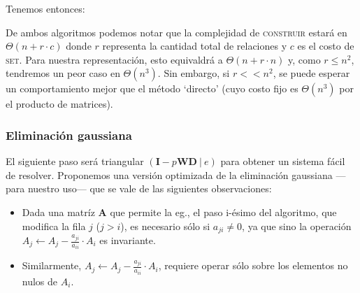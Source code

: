 \noindent Tenemos entonces:
\vspace{1em}


\vspace{1em}


\vspace{1em}

De ambos algoritmos podemos notar que la complejidad de \textsc{construir} estará en $\Theta(n + r \cdot c)$ donde $r$ representa la cantidad total de relaciones y $c$ es el costo de \textsc{set}. Para nuestra representación, esto equivaldrá a $\Theta(n + r \cdot n)$ y, como $r \leq n^2$, tendremos un peor caso en $\Theta(n^3)$. Sin embargo, si $r << n^2$, se puede esperar un comportamiento mejor que el método `directo' (cuyo costo fijo es $\Theta(n^3)$ por el producto de matrices).     

    
\vspace{3em}
\subsubsection{Eliminación gaussiana} El siguiente paso será triangular $(\mathbf{I} - p\mathbf{W}\mathbf{D} \ |\ e)$ para obtener un sistema fácil de resolver. Proponemos una versión optimizada de la eliminación gaussiana ---para nuestro uso--- que se vale de las siguientes observaciones: 

\vspace{1em}
\begin{itemize}
    \item Dada una matríz $\mathbf{A}$ que permite la eg., el paso i-ésimo del algoritmo, que modifica la fila $j$ ($j > i$), es necesario sólo si $a_{ji} \neq 0$, ya que sino la operación $A_j \leftarrow A_j - \frac{a_{ji}}{a_{ii}}\cdot A_i$ es invariante. 
    \item Similarmente, $A_j \leftarrow A_j - \frac{a_{ji}}{a_{ii}}\cdot A_i$, requiere operar sólo sobre los elementos no nulos de $A_i$.
\end{itemize}
\vspace{1em}


\vspace{1em}


\vspace{1em}

